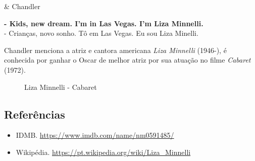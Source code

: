 \begin{tcolorbox}[enhanced,center upper,
    drop fuzzy shadow southeast, boxrule=0.3pt,
    lower separated=false,
    colframe=black!30!dialogoBorder,colback=white]
\begin{minipage}[c]{0.14\linewidth}
   & \centering \scriptsize{Chandler}
\end{minipage}
\hspace{.1mm}
\begin{minipage}[c]{0.8\linewidth}
  \textbf{- Kids, new dream. I'm in Las Vegas. I'm Liza Minnelli.}\\
  - Crianças, novo sonho. Tô em Las Vegas. Eu sou Liza Minelli.
\end{minipage}
\end{tcolorbox}

Chandler menciona a atriz e cantora americana \emph{Liza Minnelli}
(1946-), é conhecida por ganhar o Oscar de melhor atriz por sua atuação
no filme \emph{Cabaret} (1972).

\begin{figure}
  \centering
    \caption{Liza Minnelli - Cabaret\label{fig:liza-minnelli-cabaret}}
\end{figure}

\hypertarget{referuxeancias-8}{%
\subsection{Referências}\label{referuxeancias-8}}

\begin{itemize}
\tightlist
\item
  \sloppy IDMB. \url{https://www.imdb.com/name/nm0591485/}
\item
  \sloppy Wikipédia. \url{https://pt.wikipedia.org/wiki/Liza_Minnelli}
\end{itemize}
